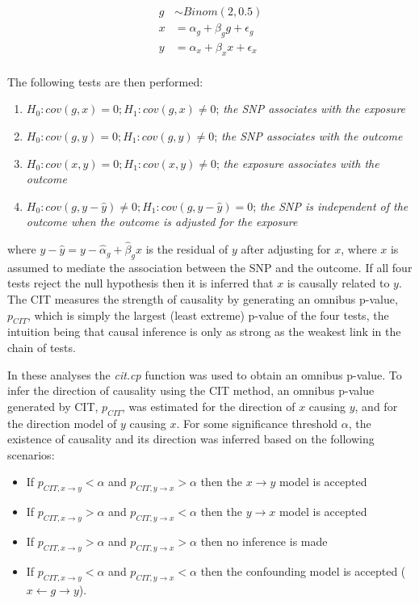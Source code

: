 \documentclass[]{article}
\providecommand{\tightlist}{%
  \setlength{\itemsep}{0pt}\setlength{\parskip}{0pt}}
\begin{document}
\[
\begin{aligned}
g & \sim Binom(2, 0.5) \\
x & = \alpha_g + \beta_g g + \epsilon_g \\
y & = \alpha_x + \beta_x x + \epsilon_x \\
\end{aligned}
\]

The following tests are then performed:

\begin{enumerate}
\def\labelenumi{\arabic{enumi}.}
\tightlist
\item
  \(H_0: cov(g, x) = 0; H_1: cov(g, x) \neq 0\); \emph{the SNP
  associates with the exposure}
\item
  \(H_0: cov(g, y) = 0; H_1: cov(g, y) \neq 0\); \emph{the SNP
  associates with the outcome}
\item
  \(H_0: cov(x, y) = 0; H_1: cov(x, y) \neq 0\); \emph{the exposure
  associates with the outcome}
\item
  \(H_0: cov(g, y - \hat{y}) \neq 0; H_1: cov(g, y - \hat{y}) = 0\);
  \emph{the SNP is independent of the outcome when the outcome is
  adjusted for the exposure}
\end{enumerate}

where \(y - \hat{y} = y - \hat{\alpha}_g + \hat{\beta}_g x\) is the
residual of \(y\) after adjusting for \(x\), where \(x\) is assumed to
mediate the association between the SNP and the outcome. If all four
tests reject the null hypothesis then it is inferred that \(x\) is
causally related to \(y\). The CIT measures the strength of causality by
generating an omnibus p-value, \(p_{CIT}\), which is simply the largest
(least extreme) p-value of the four tests, the intuition being that
causal inference is only as strong as the weakest link in the chain of
tests.

In these analyses the \emph{cit.cp} function was used to obtain an
omnibus p-value. To infer the direction of causality using the CIT
method, an omnibus p-value generated by CIT, \(p_{CIT}\), was estimated
for the direction of \(x\) causing \(y\), and for the direction model of
\(y\) causing \(x\). For some significance threshold \(\alpha\), the
existence of causality and its direction was inferred based on the
following scenarios:

\begin{itemize}
\tightlist
\item
  If \(p_{CIT, x \rightarrow y} < \alpha\) and
  \(p_{CIT, y \rightarrow x} > \alpha\) then the \(x \rightarrow y\)
  model is accepted
\item
  If \(p_{CIT, x \rightarrow y} > \alpha\) and
  \(p_{CIT, y \rightarrow x} < \alpha\) then the \(y \rightarrow x\)
  model is accepted
\item
  If \(p_{CIT, x \rightarrow y} > \alpha\) and
  \(p_{CIT, y \rightarrow x} > \alpha\) then no inference is made
\item
  If \(p_{CIT, x \rightarrow y} < \alpha\) and
  \(p_{CIT, y \rightarrow x} < \alpha\) then the confounding model is
  accepted (\(x \leftarrow g \rightarrow y\)).
\end{itemize}
\end{document}
